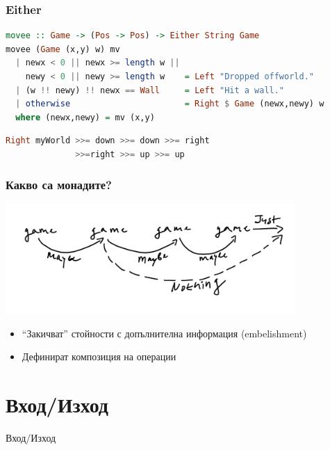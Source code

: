 \documentclass{beamer}
\begin{document}
\begin{frame}[fragile]
  \frametitle{Either}


\begin{lstlisting}[basicstyle=\tiny,language=Haskell]
movee :: Game -> (Pos -> Pos) -> Either String Game
movee (Game (x,y) w) mv 
  | newx < 0 || newx >= length w ||
    newy < 0 || newy >= length w    = Left "Dropped offworld."
  | (w !! newy) !! newx == Wall     = Left "Hit a wall."
  | otherwise                       = Right $ Game (newx,newy) w
  where (newx,newy) = mv (x,y)

\end{lstlisting}

\begin{lstlisting}[basicstyle=\small,language=Haskell]
Right myWorld >>= down >>= down >>= right 
              >>=right >>= up >>= up
\end{lstlisting}

\end{frame}



\begin{frame}[fragile]
  \frametitle{Какво са монадите?}

  \includegraphics[width=110mm]{images/composition}

\begin{itemize}
  \item ``Закичват'' стойности с допълнителна информация (embelishment)
  \item Дефинират композиция на операции
\end{itemize}

\end{frame}

\section{Вход/Изход}
\begin{frame}
  \centerline{Вход/Изход}
\end{frame}
\end{document}
